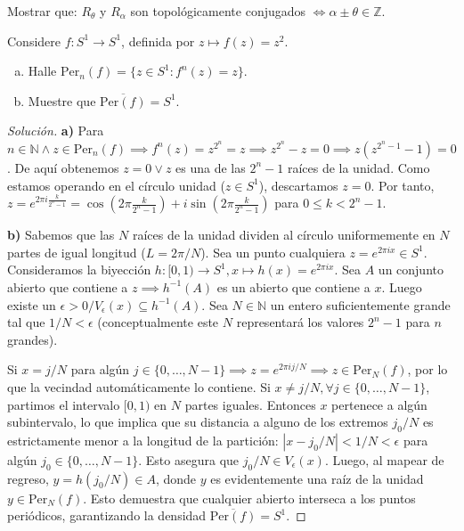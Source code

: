 \begin{ejercicio}
	Mostrar que: $R_\theta$ y $R_\alpha$ son topológicamente conjugados $\iff \alpha \pm \theta \in \mathbb{Z}$.
\end{ejercicio}

\begin{ejercicio}
	Considere $f: S^1 \to S^1$, definida por $z \mapsto f(z) = z^2$.
	\begin{enumerate}[a)]
		\item Halle $\text{Per}_n(f) = \{z \in S^1 : f^n(z) = z\}$.
		\item Muestre que $\overline{\text{Per}(f)} = S^1$.
	\end{enumerate}
\end{ejercicio}
\begin{proof}[Solución]
	\textbf{a)} Para $n \in \mathbb{N} \land z \in \text{Per}_n(f) \implies f^n(z) = z^{2^n} = z \implies z^{2^n} - z = 0 \implies z(z^{2^n-1} - 1) = 0$.
	De aquí obtenemos $z=0 \lor z$ es una de las $2^n-1$ raíces de la unidad. Como estamos operando en el círculo unidad ($z \in S^1$), descartamos $z=0$. 
	Por tanto, $z = e^{2\pi i \frac{k}{2^n-1}} = \cos\left(2\pi \frac{k}{2^n-1}\right) + i\sin\left(2\pi \frac{k}{2^n-1}\right)$ para $0 \le k < 2^n-1$.
	
	\textbf{b)} Sabemos que las $N$ raíces de la unidad dividen al círculo uniformemente en $N$ partes de igual longitud ($L = 2\pi/N$). Sea un punto cualquiera $z = e^{2\pi i x} \in S^1$.
	Consideramos la biyección $h: [0,1) \to S^1, x \mapsto h(x) = e^{2\pi i x}$. 
	Sea $A$ un conjunto abierto que contiene a $z \implies h^{-1}(A)$ es un abierto que contiene a $x$. Luego existe un $\epsilon > 0 / V_\epsilon(x) \subseteq h^{-1}(A)$. 
	Sea $N \in \mathbb{N}$ un entero suficientemente grande tal que $1/N < \epsilon$ (conceptualmente este $N$ representará los valores $2^n-1$ para $n$ grandes). 
	
	Si $x = j/N$ para algún $j \in \{0, \dots, N-1\} \implies z = e^{2\pi i j/N} \implies z \in \text{Per}_N(f)$, por lo que la vecindad automáticamente lo contiene.
	Si $x \neq j/N, \forall j \in \{0, \dots, N-1\}$, partimos el intervalo $[0,1)$ en $N$ partes iguales. Entonces $x$ pertenece a algún subintervalo, lo que implica que su distancia a alguno de los extremos $j_0/N$ es estrictamente menor a la longitud de la partición: $|x - j_0/N| < 1/N < \epsilon$ para algún $j_0 \in \{0, \dots, N-1\}$.
	Esto asegura que $j_0/N \in V_\epsilon(x)$. Luego, al mapear de regreso, $y = h(j_0/N) \in A$, donde $y$ es evidentemente una raíz de la unidad $y \in \text{Per}_N(f)$. Esto demuestra que cualquier abierto interseca a los puntos periódicos, garantizando la densidad $\overline{\text{Per}(f)} = S^1$.
\end{proof}

